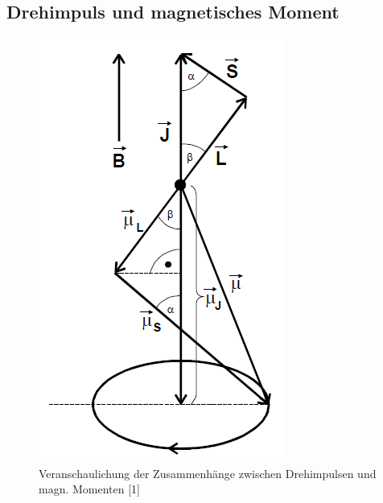 \documentclass[]{scrartcl}
\begin{document}
\subsection{Drehimpuls und magnetisches Moment}
\begin{figure}[H]
\begin{minipage}[t]{0.38\textwidth}
\vspace{0pt}
\centering
\includegraphics[width=\textwidth]{images/veranschaulichungdrehimpuls.png}
\caption{Veranschaulichung der Zusammenhänge zwischen Drehimpulsen und magn. Momenten [1]}

\end{minipage}
\end{figure}
\end{document}
